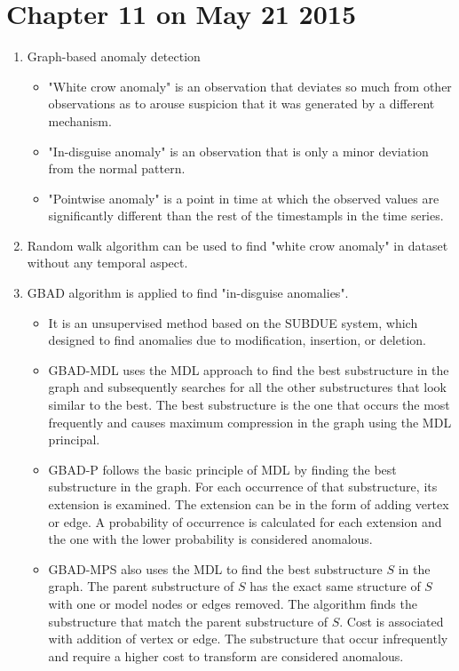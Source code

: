 \documentclass[14pt]{article}
\begin{document}
\section{Chapter 11 on May 21 2015}
\begin{enumerate}
 \item Graph-based anomaly detection
  \begin{itemize}
   \item "White crow anomaly" is an observation that deviates so much from other observations as to arouse suspicion that it was generated by a different mechanism.
   \item "In-disguise anomaly" is an observation that is only a minor deviation from the normal pattern.
   \item "Pointwise anomaly" is a point in time at which the observed values are significantly different than the rest of the timestampls in the time series. 
  \end{itemize}
 
 \item Random walk algorithm can be used to find "white crow anomaly" in dataset without any temporal aspect.
 
 \item GBAD algorithm is applied to find "in-disguise anomalies".
  \begin{itemize}
   \item It is an unsupervised method based on the SUBDUE system, which designed to find anomalies due to modification, insertion, or deletion. 
   \item GBAD-MDL uses the MDL approach to find the best substructure in the graph and subsequently searches for all the other substructures that look similar to the best. The best substructure is the one that occurs the most frequently and causes maximum compression in the graph using the MDL principal.
   \item GBAD-P follows the basic principle of MDL by finding the best substructure in the graph. For each occurrence of that substructure, its extension is examined. The extension can be in the form of adding vertex or edge. A probability of occurrence is calculated for each extension and the one with the lower probability is considered anomalous. 
   \item GBAD-MPS also uses the MDL to find the best substructure $S$ in the graph. The parent substructure of $S$ has the exact same structure of $S$ with one or model nodes or edges removed. The algorithm finds the substructure that match the parent substructure of $S$. Cost is associated with addition of vertex or edge. The substructure that occur infrequently and require a higher cost to transform are considered anomalous.
  \end{itemize}
  

\end{enumerate}
\end{document}
